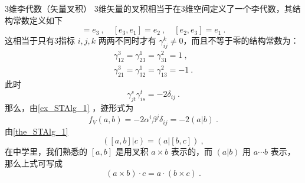 \begin{example}{3维李代数（矢量叉积）}
3维矢量的叉积相当于在3维空间定义了一个李代数，其结构常数定义如下
\begin{equation}
[e_1,e_2]=e_3~,\quad [e_3,e_1]=e_2~,\quad [e_2,e_3]=e_1~.
\end{equation}
这相当于只有3指标 $i,j,k$ 两两不同时才有 $\gamma_{ij}^k\neq0$，而且不等于零的结构常数为：
\begin{equation}
\begin{aligned}
\gamma_{12}^3=\gamma_{23}^1=\gamma_{31}^2=1~,\\
\gamma_{21}^3=\gamma_{32}^1=\gamma_{13}^2=-1~.
\end{aligned}
\end{equation}
此时
\begin{equation}
\gamma_{jt}^s\gamma_{is}^t=-2\delta_{ij}~.
\end{equation}
那么，由\autoref{ex_STAlg_1} ，迹形式为
\begin{equation}
f_V(a,b)=-2\alpha^i\beta^j\delta_{ij}=-2(a|b)~.
\end{equation}
由\autoref{the_STAlg_1} 
\begin{equation}
([a,b]|c)=(a|[b,c])~,
\end{equation}
在中学里，我们熟悉的 $[a,b]$ 是用叉积 $a\times b$ 表示的，而 $(a|b)$ 用 $a\cdots b$ 表示，那么上式可写成
\begin{equation}
(a\times b)\cdot c=a\cdot(b\times c)~.
\end{equation}

\end{example}
